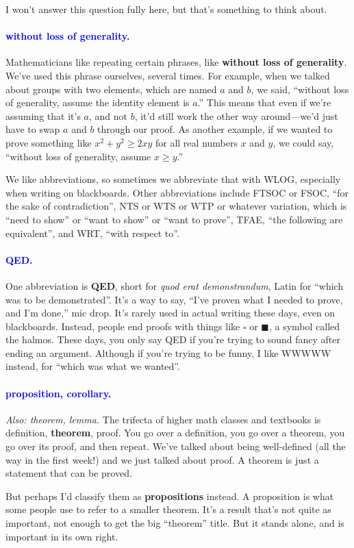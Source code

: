 \documentclass[11pt,paper=letter]{scrartcl}
\renewcommand{\bluebf}[1]{{\bfseries \color{Blue} #1}}
\renewcommand\wp[1]{\paragraph{\textcolor{Blue}{#1.}} \hspace{-1em}}
\newcommand\wl[1]{\label{w:#1}}
\newcommand\oww[1]{\textit{Also: #1.}}
\begin{document}
I won't answer this question fully here, but that's something to think about.

\wp{without loss of generality}
\wl{without loss of generality}
Mathematicians like repeating certain phrases, like \bluebf{without loss of generality}. We've used this phrase ourselves, several times. For example, when we talked about groups with two elements, which are named $a$ and $b$, we said, ``without loss of generality, assume the identity element is $a$.'' This means that even if we're assuming that it's $a$, and not $b$, it'd still work the other way around---we'd just have to swap $a$ and $b$ through our proof. As another example, if we wanted to prove something like $x^2 + y^2 \ge 2xy$ for all real numbers $x$ and $y$, we could say, ``without loss of generality, assume $x \ge y$.''

We like abbreviations, so sometimes we abbreviate that with WLOG, especially when writing on blackboards. Other abbreviations include FTSOC or FSOC, ``for the sake of contradiction'', NTS or WTS or WTP or whatever variation, which is ``need to show'' or ``want to show'' or ``want to prove'', TFAE, ``the following are equivalent'', and WRT, ``with respect to''.

\wp{QED}
\wl{QED}
One abbreviation is \bluebf{QED}, short for \textit{quod erat demonstrandum}, Latin for ``which was to be demonstrated''. It's a way to say, ``I've proven what I needed to prove, and I'm done,'' mic drop. It's rarely used in actual writing these days, even on blackboards. Instead, people end proofs with things like $\square$ or $\blacksquare$, a symbol called the halmos. These days, you only say QED if you're trying to sound fancy after ending an argument. Although if you're trying to be funny, I like WWWWW instead, for ``which was what we wanted''.

\wp{proposition, corollary}
\wl{proposition}
\wl{corollary}
\oww{theorem, lemma}
The trifecta of higher math classes and textbooks is definition, \textbf{theorem}, proof. You go over a definition, you go over a theorem, you go over its proof, and then repeat. We've talked about being well-defined (all the way in the first week!) and we just talked about proof. A theorem is just a statement that can be proved.

But perhaps I'd classify them as \bluebf{propositions} instead. A proposition is what some people use to refer to a smaller theorem. It's a result that's not quite as important, not enough to get the big ``theorem'' title. But it stands alone, and is important in its own right.
\end{document}
